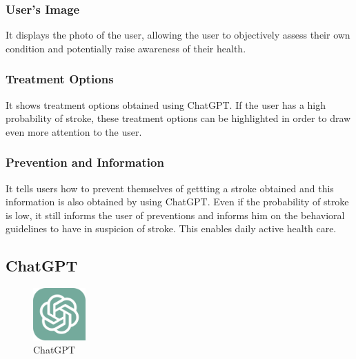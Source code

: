 \subsubsection{\textbf{User's Image}}
It displays the photo of the user, allowing the user to objectively assess their own condition and potentially raise awareness of their health.\\
\subsubsection{\textbf{Treatment Options}}
It shows treatment options obtained using ChatGPT. If the user has a high probability of stroke, these treatment options can be highlighted in order to draw even more attention to the user.\\
\subsubsection{\textbf{Prevention and Information}}
It tells users how to prevent themselves of gettting a stroke obtained and this information is also obtained by using ChatGPT. Even if the probability of stroke is low, it still informs the user of preventions and informs him on the behavioral guidelines to have in suspicion of stroke. This enables daily active health care.\\

\subsection{\textbf{ChatGPT}}

\begin{figure}[htp]
\centering
\includegraphics[width=2cm]{images/chatgpt.png}
\caption{ChatGPT}
\label{fig:chatgpt}
\end{figure}

